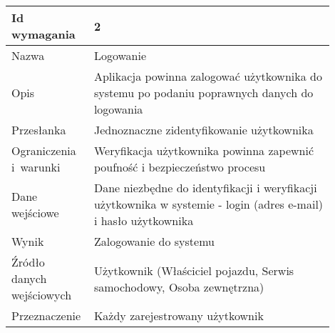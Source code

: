 \documentclass[12pt]{article}
\begin{document}
\begin{table}[H]
\begin{center}
\end{center}
	\begin{tabular}{|p{0.18\linewidth}|p{0.72\linewidth}|}%
	\hline
	Id wymagania 	& 2 				\\ \hline
	Nazwa			& Logowanie \\ \hline
	Opis & Aplikacja powinna zalogować użytkownika do systemu po
podaniu poprawnych danych do logowania
\\ \hline
	Przesłanka & Jednoznaczne zidentyfikowanie użytkownika  \\ \hline
	Ograniczenia i~warunki & Weryfikacja użytkownika powinna zapewnić poufność i bezpieczeństwo procesu  \\ \hline
	Dane wejściowe & Dane niezbędne do identyfikacji i weryfikacji użytkownika
w systemie - login (adres e-mail) i hasło użytkownika
  \\ \hline
	Wynik & Zalogowanie do systemu \\ \hline
	Źródło danych wejściowych & Użytkownik (Właściciel pojazdu, Serwis samochodowy, Osoba zewnętrzna) \\ \hline
	Przeznaczenie & Każdy zarejestrowany użytkownik \\ \hline
	\end{tabular}

\end{table}
\end{document}
